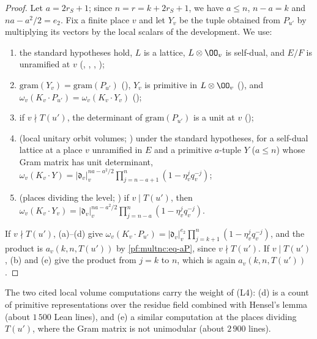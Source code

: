 \begin{proof}
Let $a=2r_S+1$; since $n=r=k+2r_S+1$, we have $a\le n$, $n-a=k$ and $na-a^2/2=e_2$. Fix a finite place $v$ and let $Y_v$ be
the tuple obtained from $P_{u'}$ by multiplying its vectors by the local scalars of the development. We use:
\begin{enumerate}[label=(\alph*)]
\item the standard hypotheses hold, $L$ is a lattice, $L\otimes\OO_v$ is self-dual, and $E/F$ is unramified at $v$
(, ,
, );
\item $\mathrm{gram}(Y_v)=\mathrm{gram}(P_{u'})$ (), $Y_v$ is primitive in
$L\otimes\OO_v$ (), and $\omega_v(K_v\cdot P_{u'})=
\omega_v(K_v\cdot Y_v)$ ();
\item if $v\nmid T(u')$, the determinant of $\mathrm{gram}(P_{u'})$ is a unit at $v$
();
\item (local unitary orbit volumes; ) under the standard hypotheses, for a
self-dual lattice at a place $v$ unramified in $E$ and a primitive $a$-tuple $Y$ ($a\le n$) whose Gram matrix has unit
determinant, $\omega_v(K_v\cdot Y)=|\mathfrak d_v|_v^{na-a^2/2}\prod_{j=n-a+1}^{n}(1-\eta_v^jq_v^{-j})$;
\item (places dividing the level; ) if $v\mid T(u')$, then
$\omega_v(K_v\cdot Y_v)=|\mathfrak d_v|_v^{na-a^2/2}\prod_{j=n-a}^{n}(1-\eta_v^jq_v^{-j})$.
\end{enumerate}
If $v\nmid T(u')$, (a)--(d) give $\omega_v(K_v\cdot P_{u'})=|\mathfrak d_v|_v^{e_2}\prod_{j=k+1}^n(1-\eta_v^jq_v^{-j})$, and
the product is $a_v(k,n,T(u'))$ by \eqref{pf:multnc:eq-aP}, since $v\nmid T(u')$. If $v\mid T(u')$, (b) and (e) give the
product from $j=k$ to $n$, which is again $a_v(k,n,T(u'))$.
\end{proof}

The two cited local volume computations carry the weight of (L4): (d) is a count of primitive representations over the
residue field combined with Hensel's lemma (about $1\,500$ Lean lines), and (e) a similar computation at the places
dividing $T(u')$, where the Gram matrix is not unimodular (about $2\,900$ lines).

